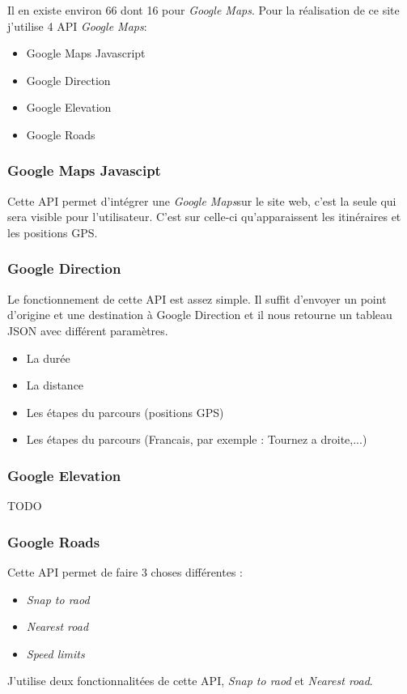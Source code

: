 \documentclass[a4paper]{article}
\newcommand{\gmap}{\emph{Google Maps}}
\begin{document}
Il en existe environ 66 dont 16 pour \gmap. Pour la réalisation de ce site j'utilise 4 API \gmap : 
\begin{itemize}
    \item Google Maps Javascript
    \item Google Direction
    \item Google Elevation
    \item Google Roads
\end{itemize}

\subsubsection{Google Maps Javascipt}
Cette API permet d'intégrer une \gmap sur le site web, c'est la seule qui sera visible pour l'utilisateur. C'est sur celle-ci qu'apparaissent les itinéraires et les positions GPS.
\subsubsection{Google Direction}
Le fonctionnement de cette API est assez simple. Il suffit d'envoyer un point d'origine et une destination à Google Direction et il nous retourne un tableau JSON avec différent paramètres.
\begin{itemize}
    \item La durée
    \item La distance
    \item Les étapes du parcours (positions GPS)
    \item Les étapes du parcours (Francais, par exemple : Tournez a droite,...)
\end{itemize}

\subsubsection{Google Elevation}
TODO
\subsubsection{Google Roads}
Cette API permet de faire 3 choses différentes :
\begin{itemize}
    \item \emph{Snap to raod}
    \item \emph{Nearest road}
    \item \emph{Speed limits}
\end{itemize}

J'utilise deux fonctionnalitées de cette API, \emph{Snap to raod} et \emph{Nearest road}.
\end{document}
